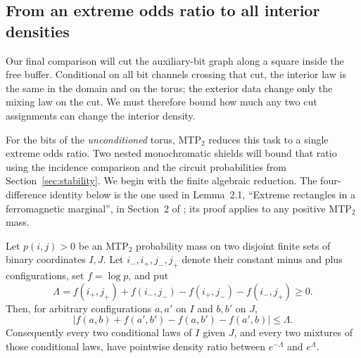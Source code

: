 \subsection{From an extreme odds ratio to all interior densities}

Our final comparison will cut the auxiliary-bit graph along a square
inside the free buffer.  Conditional on all bit channels crossing that
cut, the interior law is the same in the domain and on the torus; the
exterior data change only the mixing law on the cut.  We must therefore
bound how much any two cut assignments can change the interior density.

For the bits of the \emph{unconditioned} torus, MTP\(_2\) reduces this
task to a single extreme odds ratio.  Two nested monochromatic shields
will bound that ratio using the incidence comparison and the circuit
probabilities from Section~\ref{sec:stability}.  We begin with the finite
algebraic reduction.  The four-difference identity below is the one used
in Lemma~2.1,
``Extreme rectangles in a ferromagnetic marginal'', in Section~2 of
\cite{OpenAIStatic2026}; its proof applies to any positive MTP\(_2\) mass.

\begin{lemma}
\label{lem:comparison-rectangles}
Let \(p(i,j)>0\) be an MTP\(_2\) probability mass on two disjoint finite
sets of binary coordinates \(I,J\).  Let \(i_-,i_+,j_-,j_+\) denote their
constant minus and plus configurations, set \(f=\log p\), and put
\begin{equation}
 \Lambda=f(i_+,j_+)+f(i_-,j_-)
              -f(i_+,j_-)-f(i_-,j_+)\ge0.
 \label{eq:comparison-extreme-ratio}
\end{equation}
Then, for arbitrary configurations \(a,a'\) on \(I\) and \(b,b'\) on
\(J\),
\begin{equation}
 \bigl|f(a,b)+f(a',b')-f(a,b')-f(a',b)\bigr|\le\Lambda.
 \label{eq:comparison-all-rectangles}
\end{equation}
Consequently every two conditional laws of \(I\) given \(J\), and every
two mixtures of those conditional laws, have pointwise density ratio
between \(e^{-\Lambda}\) and \(e^{\Lambda}\).
\end{lemma}


